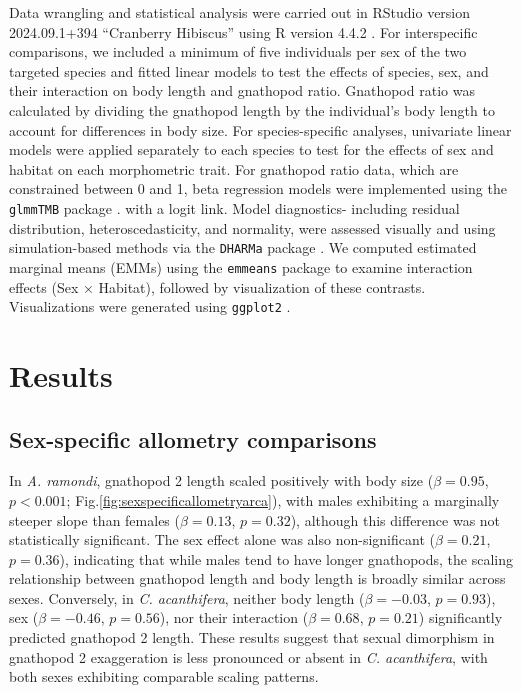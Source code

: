 \documentclass[journal,article,submit,pdftex,moreauthors]{Definitions/mdpi}
\begin{document}
    		Data wrangling and statistical analysis were carried out in RStudio version 2024.09.1+394 “Cranberry Hibiscus” using R version 4.4.2 \citep{R2024}. For interspecific comparisons, we included a minimum of five individuals per sex of the two targeted species and fitted linear models to test the effects of species, sex, and their interaction on body length and gnathopod ratio. Gnathopod ratio was calculated by dividing the gnathopod length by the individual’s body length to account for differences in body size. For species-specific analyses, univariate linear models were applied separately to each species to test for the effects of sex and habitat on each morphometric trait. For gnathopod ratio data, which are constrained between 0 and 1, beta regression models were implemented using the  \texttt{glmmTMB} package \citep{brooks2017}. with a logit link. Model diagnostics- including residual distribution, heteroscedasticity, and normality, were assessed visually and using simulation-based methods via the \texttt{DHARMa} package \citep{hartig2024}. We computed estimated marginal means (EMMs) using the \texttt{emmeans} package \citep{lenth2025} to examine interaction effects (Sex × Habitat), followed by visualization of these contrasts. Visualizations were generated using \texttt{ggplot2} \citep{wickham2016}.




\section{Results}

\subsection{Sex-specific allometry comparisons}
    		
    In \textit{A. ramondi}, gnathopod 2 length scaled positively with body size ($\beta = 0.95$, $p < 0.001$;
    Fig.\ref{fig:sexspecificallometryarca}), with males exhibiting a marginally steeper slope than females ($\beta =
    0.13$, $p = 0.32$), although this difference was not statistically significant. The sex effect
    alone was also non-significant ($\beta = 0.21$, $p = 0.36$), indicating that while males tend to
    have longer gnathopods, the scaling relationship between gnathopod length and body
    length is broadly similar across sexes. Conversely, in \textit{C. acanthifera}, neither body
    length ($\beta = -0.03$, $p = 0.93$), sex ($\beta = -0.46$, $p = 0.56$), nor their interaction ($\beta = 0.68$, $p
    = 0.21$) significantly predicted gnathopod 2 length. These results suggest that sexual
    dimorphism in gnathopod 2 exaggeration is less pronounced or absent in \textit{C. acanthifera},
    with both sexes exhibiting comparable scaling patterns.
    		
\end{document}

